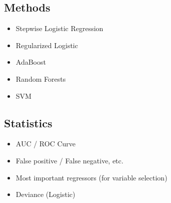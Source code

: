 \documentclass[11pt]{article}
\begin{document}
\subsection*{Methods}
\begin{itemize}
    \item Stepwise Logistic Regression
    \item Regularized Logistic
    \item AdaBoost
    \item Random Forests
    \item SVM
\end{itemize}

\subsection*{Statistics}
\begin{itemize}
    \item AUC / ROC Curve
    \item False positive / False negative, etc.
    \item Most important regressors (for variable selection)
    \item Deviance (Logistic)
\end{itemize}
\end{document}
